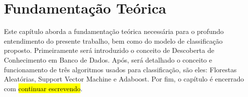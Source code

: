 \chapter{Fundamentação Teórica}
Este capítulo aborda a fundamentação teórica necessária para o profundo entendimento do presente trabalho, bem como do modelo de classificação proposto. Primeiramente será introduzido o conceito de Descoberta de Conhecimento em Banco de Dados. Após, será detalhado o conceito e funcionamento de três algoritmos usados para classificação, são eles: Florestas Aleatórias, Support Vector Machine e Adaboost. Por fim, o capítulo é encerrado com \hl{continuar escrevendo}.









